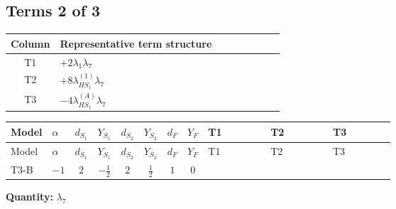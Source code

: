 \documentclass[8pt]{article}
\begin{document}
\begin{landscape}
\subsection*{Terms 2 of 3}
\begin{center}
\begin{tabular}{@{}c >{\raggedright\arraybackslash}p{0.82\linewidth}@{}}
\toprule
Column & Representative term structure \\
\midrule
T1 & \(\displaystyle +2 {\lambda_1} {\lambda_{7}}\) \\
\midrule
T2 & \(\displaystyle +8 {\lambda_{HS_1}^{(1)}} {\lambda_{7}}\) \\
\midrule
T3 & \(\displaystyle -4 {\lambda_{HS_1}^{(A)}} {\lambda_{7}}\) \\
\midrule
\bottomrule
\end{tabular}
\end{center}
\smallskip
\tiny
\begin{longtable}{@{}llcccccc >{\raggedright\arraybackslash}p{0.21\linewidth} >{\raggedright\arraybackslash}p{0.21\linewidth} >{\raggedright\arraybackslash}p{0.21\linewidth}@{}}
\toprule
Model & $\alpha$ & $d_{S_1}$ & $Y_{S_1}$ & $d_{S_2}$ & $Y_{S_2}$ & $d_F$ & $Y_F$ & T1 & T2 & T3 \\
\midrule
\endfirsthead
\toprule
Model & $\alpha$ & $d_{S_1}$ & $Y_{S_1}$ & $d_{S_2}$ & $Y_{S_2}$ & $d_F$ & $Y_F$ & T1 & T2 & T3 \\
\midrule
\endhead
T3-B & $-1$ & $2$ & $-\frac{1}{2}$ & $2$ & $\frac{1}{2}$ & $1$ & $0$ & \scriptsize\adjustbox{max width=\linewidth}{$\begin{gathered} +2 {\lambda_1} {\lambda_{7}}\end{gathered}$} & \scriptsize\adjustbox{max width=\linewidth}{$\begin{gathered} +8 {\lambda_{HS_1}^{(1)}} {\lambda_{7}}\end{gathered}$} & \scriptsize\adjustbox{max width=\linewidth}{$\begin{gathered} -4 {\lambda_{HS_1}^{(A)}} {\lambda_{7}}\end{gathered}$} \\
\midrule
\bottomrule
\end{longtable}
\clearpage
\noindent\textbf{Quantity: }$\lambda_{7}$\par\smallskip

\end{landscape}
\end{document}
